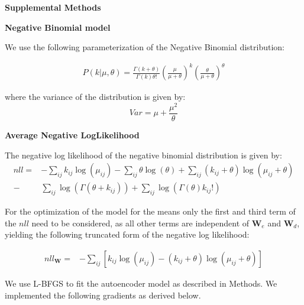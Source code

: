 \documentclass[11pt]{letter}
\newcommand{\matr}[1]{\mathbf{#1}}
\begin{document}
\textbf{Supplemental Methods}

\textbf{Negative Binomial model}

We use the following parameterization of the Negative Binomial distribution:

\begin{align*}
P(k| \mu, \theta) = \frac{\Gamma(k + \theta)}{\Gamma(k) \theta!}  
\left ( \frac{\mu}{\mu + \theta} \right )^{k}
\left ( \frac{\theta}{\mu + \theta} \right)^{\theta} 
\end{align*}

where the variance of the distribution is given by:
\[
Var = \mu + \frac{\mu^2}{\theta}
\]


% 
% 
% 
% 




\textbf{Average Negative LogLikelihood}

The negative log likelihood of the negative binomial distribution is given by:
\begin{align*}
nll=& -\sum_{ij} k_{ij} \log{(\mu_{ij})} - 
\sum_{ij} \theta \log{(\theta)} +
\sum_{ij} (k_{ij} + \theta) \log{(\mu_{ij} + \theta)} \\
-&\sum_{ij} \log{(\Gamma(\theta + k_{ij}))} 
+ \sum_{ij} \log{(\Gamma({\theta}) k_{ij}!)}
\end{align*}


For the optimization of the model for the means only the first and third 
term of the $nll$ need to be considered, as all other terms are independent of 
$\matr{W}_e$ and $\matr{W}_d$, yielding the following truncated form of the 
negative log likelihood:

\begin{align*}
nll_{\matr{W}}=& -\sum_{ij} \left[ k_{ij} \log{(\mu_{ij})} -
 (k_{ij} + \theta) \log{(\mu_{ij} + \theta)} \right]
\end{align*}


We use L-BFGS to fit the autoencoder model as described in Methods.
We implemented the following gradients as derived below.
\end{document}
